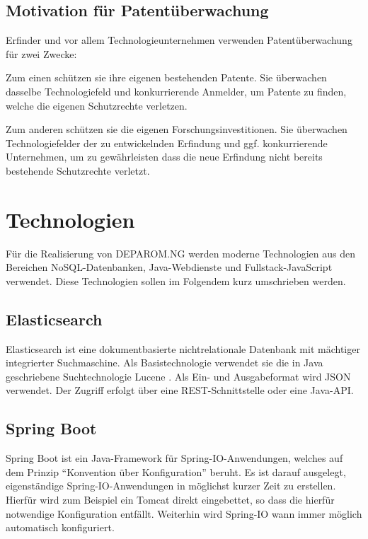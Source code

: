 \subsection{Motivation für Patentüberwachung}
\label{ch:fachlichesUmfeld:PatentspezifischeBegriffe:Motivation}

Erfinder und vor allem Technologieunternehmen verwenden Patentüberwachung für
zwei Zwecke:

Zum einen schützen sie ihre eigenen bestehenden Patente. Sie überwachen dasselbe
Technologiefeld und konkurrierende Anmelder, um Patente zu finden, welche die
eigenen Schutzrechte verletzen.

Zum anderen schützen sie die eigenen Forschungsinvestitionen. Sie überwachen
Technologiefelder der zu entwickelnden Erfindung und ggf. konkurrierende
Unternehmen, um zu gewährleisten dass die neue Erfindung nicht bereits
bestehende Schutzrechte verletzt.

\section{Technologien}
\label{ch:fachlichesUmfeld:Technologien}

Für die Realisierung von DEPAROM.NG werden moderne Technologien aus den Bereichen
NoSQL-Datenbanken, Java-Webdienste und Fullstack-JavaScript verwendet. Diese
Technologien sollen im Folgendem kurz umschrieben werden.

\subsection{Elasticsearch}
\label{ch:fachlichesUmfeld:Technologien:Elastichsearch}

Elasticsearch ist eine dokumentbasierte nichtrelationale Datenbank mit mächtiger
integrierter Suchmaschine. Als Basistechnologie verwendet sie die in Java
geschriebene Suchtechnologie Lucene \cite{lucene}. Als Ein- und Ausgabeformat
wird JSON verwendet. Der Zugriff erfolgt über eine REST-Schnittstelle oder eine
Java-API.

\subsection{Spring Boot}
\label{ch:fachlichesUmfeld:Technologien:SpringBoot}

Spring Boot ist ein Java-Framework für Spring-IO-Anwendungen, welches auf dem
Prinzip "`Konvention über Konfiguration"' beruht. Es ist darauf ausgelegt,
eigenständige Spring-IO-Anwendungen in möglichst kurzer Zeit zu erstellen.
Hierfür wird zum Beispiel ein Tomcat direkt eingebettet, so dass die  hierfür
notwendige Konfiguration entfällt. Weiterhin wird Spring-IO wann immer möglich
automatisch konfiguriert.

